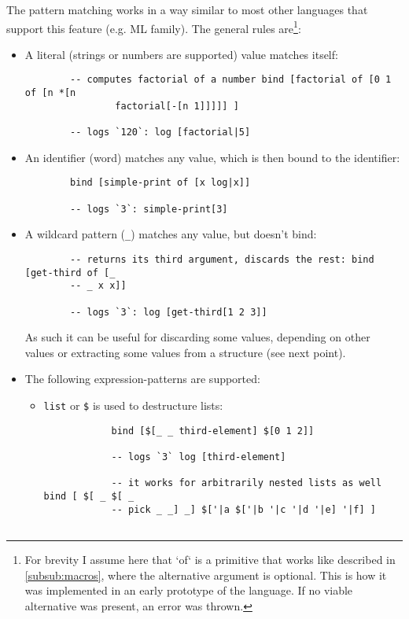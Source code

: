 The pattern matching works in a way similar to most other languages that support
this feature (e.g. ML family). The general rules are\footnote{For brevity I
  assume here that `of` is a primitive that works like described in
  \ref{subsub:macros}, where the alternative argument is optional. This is how
  it was implemented in an early prototype of the language. If no viable
  alternative was present, an error was thrown.}:
\begin{itemize}
    \item A literal (strings or numbers are supported) value matches itself:
    \begin{lstlisting}
        -- computes factorial of a number bind [factorial of [0 1 of [n *[n
                factorial[-[n 1]]]]] ]
        
        -- logs `120`: log [factorial|5]
    \end{lstlisting}
    \item An identifier (word) matches any value, which is then bound to the
      identifier:
    \begin{lstlisting}
        bind [simple-print of [x log|x]]
        
        -- logs `3`: simple-print[3]
    \end{lstlisting}
    \item A wildcard pattern (\texttt{\_}) matches any value, but doesn't bind:
    \begin{lstlisting}
        -- returns its third argument, discards the rest: bind [get-third of [_
        -- _ x x]]
        
        -- logs `3`: log [get-third[1 2 3]]
    \end{lstlisting}
    As such it can be useful for discarding some values, depending on other
    values or extracting some values from a structure (see next point).
    \item The following expression-patterns are supported:
    \begin{itemize}
        \item \texttt{list} or \texttt{\$} is used to destructure lists:
        \begin{lstlisting}
            bind [$[_ _ third-element] $[0 1 2]]
            
            -- logs `3` log [third-element]
            
            -- it works for arbitrarily nested lists as well bind [ $[ _ $[ _
            -- pick _ _] _] $['|a $['|b '|c '|d '|e] '|f] ]
            

\end{lstlisting}
\end{itemize}
\end{itemize}
